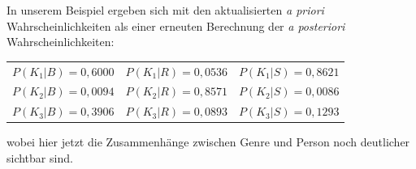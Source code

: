 \begin{beispiel}[Internetwerbung]
In unserem Beispiel ergeben sich mit den aktualisierten \textit{a priori} Wahrscheinlichkeiten als einer erneuten Berechnung der \textit{a posteriori} Wahrscheinlichkeiten:

\begin{center}
\begin{tabular}{lll}
  $P(K_1|B) = 0{,}6000$ & $P(K_1|R) = 0{,}0536$ & $P(K_1|S) = 0{,}8621$ \\
  $P(K_2|B) = 0{,}0094$ & $P(K_2|R) = 0{,}8571$ & $P(K_2|S) = 0{,}0086$ \\
  $P(K_3|B) = 0{,}3906$ & $P(K_3|R) = 0{,}0893$ & $P(K_3|S) = 0{,}1293$ \\
\end{tabular}
\end{center}

wobei hier jetzt die Zusammenhänge zwischen Genre und Person noch deutlicher sichtbar sind.
\end{beispiel}
